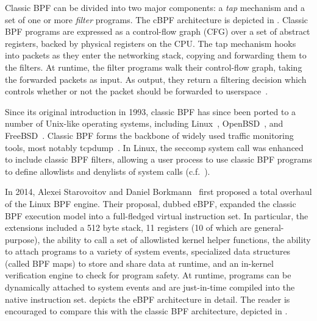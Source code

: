 Classic BPF can be divided into two major components: a \textit{tap} mechanism and a set
of one or more \textit{filter} programs. The cBPF architecture is depicted in
. Classic BPF programs are expressed as a control-flow graph (CFG)
over a set of abstract registers, backed by physical registers on the CPU. The tap
mechanism hooks into packets as they enter the networking stack, copying and forwarding
them to the filters. At runtime, the filter programs walk their control-flow graph, taking
the forwarded packets as input. As output, they return a filtering decision which controls
whether or not the packet should be forwarded to userspace~\cite{mccanne1993_bpf}.

Since its original introduction in 1993, classic BPF has since been ported to a number of
Unix-like operating systems, including Linux~\cite{linux_bpf}, OpenBSD~\cite{openbsd_bpf},
and FreeBSD~\cite{freebsd_bpf}. Classic BPF forms the backbone of widely used traffic
monitoring tools, most notably tcpdump~. In Linux, the seccomp system
call was enhanced to include classic BPF filters, allowing a user process to use classic BPF
programs to define allowlists and denylists of system calls (c.f.~).

In 2014, Alexei Starovoitov and Daniel Borkmann~\cite{starovoitov2014_ebpf} first proposed
a total overhaul of the Linux BPF engine. Their proposal, dubbed eBPF, expanded the
classic BPF execution model into a full-fledged virtual instruction set. In particular,
the extensions included a 512 byte stack, 11 registers (10 of which are general-purpose),
the ability to call a set of allowlisted kernel helper functions, the ability to attach
programs to a variety of system events, specialized data structures (called BPF maps) to
store and share data at runtime, and an in-kernel verification engine to check for program
safety. At runtime, programs can be dynamically attached to system events and are
just-in-time compiled into the native instruction set.   depicts
the eBPF architecture in detail. The reader is encouraged to compare this with the classic
BPF architecture, depicted in .

